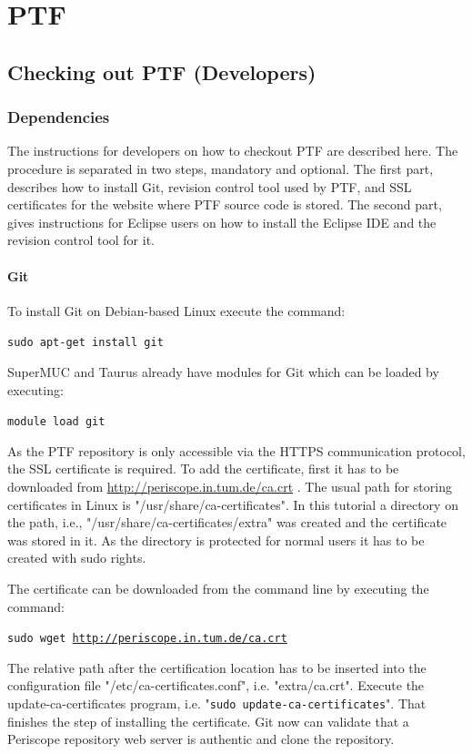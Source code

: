 \documentclass[11pt,a4paper, oneside]{book} %
\newcommand{\gitrepocert}{\url{http://periscope.in.tum.de/ca.crt} }
\begin{document}
\chapter{PTF}

\section{Checking out PTF (Developers)}

\subsection{Dependencies}

The instructions for developers on how to checkout PTF are described here. The
procedure is separated in two steps, mandatory and optional. The first part,
describes how to install Git, revision control tool used by PTF, and SSL
certificates for the website where PTF source code is stored. The second part,
gives instructions for Eclipse users on how to install the Eclipse IDE and the
revision control tool for it.

\subsubsection{Git}
To install Git on Debian-based Linux execute the command:

\texttt{sudo apt-get install git}

SuperMUC and Taurus already have modules for Git which can be loaded by
executing:

\texttt{module load git}


As the PTF repository is only accessible via the HTTPS communication protocol,
the SSL certificate is required. To add the certificate, first it has to be
downloaded from \gitrepocert. The usual path for storing certificates in Linux
is "/usr/share/ca-certificates". In this tutorial a directory on the path, i.e.,
"/usr/share/ca-certificates/extra" was created and the certificate was stored in
it. As the directory is protected for normal users it has to be created with
sudo rights.

The certificate can be downloaded from the command line by executing the
command:

\texttt{sudo wget \gitrepocert}

The relative path after the certification location has to be inserted into the
configuration file "/etc/ca-certificates.conf", i.e. "extra/ca.crt". Execute
the update-ca-certificates program, i.e. "\texttt{sudo update-ca-certificates}".
That finishes the step of installing the certificate. Git now can validate that
a Periscope repository web server is authentic and clone the repository.
\end{document}
